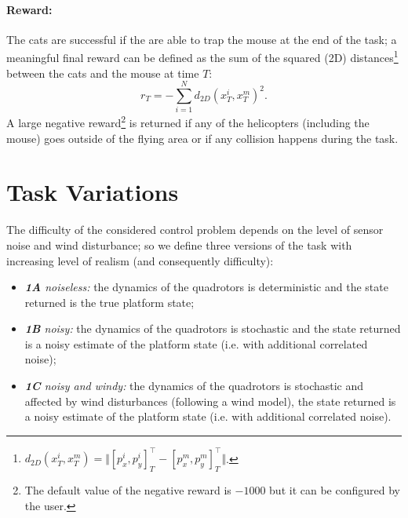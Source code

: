 \documentclass[a4paper,11pt]{report}
\begin{document}
\paragraph{Reward:}
The cats are successful if the are able to trap the mouse at the end of the task; a meaningful final reward can be defined as the sum of the squared (2D) distances\footnote{$d_{2D}(x^i_T,x^m_T) = \Vert[p^i_x,p^i_y]_T^\intercal - [p^m_x,p^m_y]_T^\intercal\Vert$.} between the cats and the mouse at time $T$:
$$r_T = - \sum^N_{i=1} d_{2D}(x^i_T,x^m_T)^2.$$
A large negative reward\footnote{The default value of the negative reward is $-1000$ but it can be configured by the user.} is returned if any of the helicopters (including the mouse) goes outside of the flying area or if any collision happens during the task.

\section{Task Variations} \label{CatMouseVariations}
The difficulty of the considered control problem depends on the level of sensor noise and wind disturbance; so we define three versions of the task with increasing level of realism (and consequently difficulty):
\begin{itemize}
 \item \textit{\textbf{1A} noiseless:} the dynamics of the quadrotors is deterministic and the state returned is the true platform state;
 \item \textit{\textbf{1B} noisy:} the dynamics of the quadrotors is stochastic and the state returned is a noisy estimate of the platform state (i.e. with additional correlated noise);
 \item \textit{\textbf{1C} noisy and windy:} the dynamics of the quadrotors is stochastic and affected by wind disturbances (following a wind model), the state returned is a noisy estimate of the platform state (i.e. with additional correlated noise).
\end{itemize}

\end{document}
